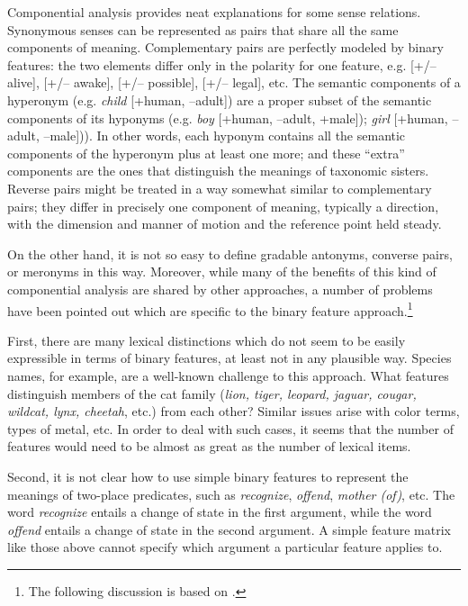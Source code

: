 Componential analysis provides neat explanations for some sense relations. Synonymous senses can be represented as pairs that share all the same components of meaning. Complementary pairs are perfectly modeled by binary features: the two elements differ only in the polarity for one feature, e.g. [+/– alive], [+/– awake], [+/– possible], [+/– legal], etc. The semantic components of a hyperonym (e.g. \textit{child} [+human, –adult]) are a proper subset of the semantic components of its hyponyms (e.g. \textit{boy} [+human, –adult, +male]); \textit{girl} [+human, –adult, –male])). In other words, each hyponym contains all the semantic components of the hyperonym plus at least one more; and these “extra” components are the ones that distinguish the meanings of taxonomic sisters. Reverse pairs might be treated in a way somewhat similar to complementary pairs; they differ in precisely one component of meaning, typically a direction, with the dimension and manner of motion and the reference point held steady.



On the other hand, it is not so easy to define gradable antonyms, converse pairs, or meronyms in this way. Moreover, while many of the benefits of this kind of componential analysis are shared by other approaches, a number of problems have been pointed out which are specific to the binary feature approach.\footnote{The following discussion is based on \textcites[129--130]{Engelberg2011}[317ff.]{Lyons1977}.}



First, there are many lexical distinctions which do not seem to be easily expressible in terms of binary features, at least not in any plausible way. Species names, for example, are a well-known challenge to this approach. What features distinguish members of the cat family (\textit{lion, tiger, leopard, jaguar, cougar, wildcat, lynx, cheetah}, etc.) from each other? Similar issues arise with color terms, types of metal, etc. In order to deal with such cases, it seems that the number of features would need to be almost as great as the number of lexical items.



Second, it is not clear how to use simple binary features to represent the meanings of two-place predicates, such as \textit{recognize}, \textit{offend}, \textit{mother (of)}, etc. The word \textit{recognize} entails a change of state in the first argument, while the word \textit{offend} entails a change of state in the second argument. A simple feature matrix like those above cannot specify which argument a particular feature applies to.



